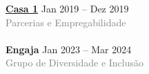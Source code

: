 \documentclass[9pt]{developercv} %
\begin{document}
\hfill
\begin{minipage}[t]{0.3\textwidth}
	\vspace{-\baselineskip} %


	\textbf{\textcolor{bleu_cite}{\href{https://www.casaum.org/}{Casa 1}} } \hspace{1.cm} Jan 2019 --  Dez 2019\\
	\textcolor{gray}{Parcerias e Empregabilidade}\\\\
	\textbf{Engaja} \hspace{0.95cm} Jan 2023 --  Mar 2024\\
	\textcolor{gray}{Grupo de Diversidade e Inclusão}
\end{minipage}


\end{document}
